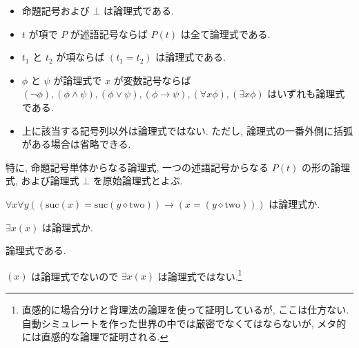 \begin{nmprob}
{\begin{itemize}
    \item 命題記号および $\bot$ は論理式である.
    \item $t$ が項で $P$ が述語記号ならば $P(t)$ は全て論理式である.
    \item $t_1$ と $t_2$ が項ならば $(t_1 = t_2)$ は論理式である.
    \item $\phi$ と $\psi$ が論理式で $x$ が変数記号ならば $(\lnot \phi), (\phi \land \psi), (\phi \lor \psi), (\phi \to \psi), (\forall x \phi), (\exists x \phi)$
    はいずれも論理式である.
    \item 上に該当する記号列以外は論理式ではない. ただし, 論理式の一番外側に括弧がある場合は省略できる.
\end{itemize}
特に, 命題記号単体からなる論理式, 一つの述語記号からなる $P(t)$ の形の論理式, および論理式 $\bot$ を原始論理式とよぶ.
}{
\item $\forall x \forall y ((\text{suc}(x) = \text{suc}(y \diamond \text{two})) \to (x = (y \diamond \text{two})))$ は論理式か.
\item $\exists x(x)$ は論理式か.
}{
\item 論理式である.
\item $(x)$ は論理式でないので $\exists x(x)$ は論理式ではない.\footnote[2]{直感的に場合分けと背理法の論理を使って証明しているが, ここは仕方ない. 自動シミュレートを作った世界の中では厳密でなくてはならないが, メタ的には直感的な論理で証明される.\vspace{30pt}}
}
\setcounter{table}{0}
\end{nmprob}



